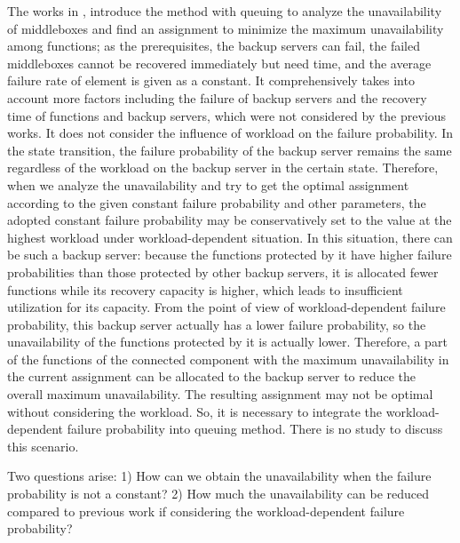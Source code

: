 \documentclass[conference]{IEEEtran}
\begin{document}
The works in \cite{he2020unavailability}, \cite{fujita2021analytical} introduce the method with queuing to analyze the unavailability of middleboxes and find an assignment to minimize the maximum unavailability among functions; as the prerequisites, the backup servers can fail, the failed middleboxes cannot be recovered immediately but need time, and the average failure rate of element is given as a constant. It comprehensively takes into account more factors including the failure of backup servers and the recovery time of functions and backup servers, which were not considered by the previous works. It does not consider the influence of workload on the failure probability. In the state transition, the failure probability of the backup server remains the same regardless of the workload on the backup server in the certain state. Therefore, when we analyze the unavailability and try to get the optimal assignment according to the given constant failure probability and other parameters, the adopted constant failure probability may be conservatively set to the value at the highest workload under workload-dependent situation. In this situation, there can be such a backup server: because the functions protected by it have higher failure probabilities than those protected by other backup servers, it is allocated fewer functions while its recovery capacity is higher, which leads to insufficient utilization for its capacity. From the point of view of workload-dependent failure probability, this backup server actually has a lower failure probability, so the unavailability of the functions protected by it is actually lower. Therefore, a part of the functions of the connected component with the maximum unavailability in the current assignment can be allocated to the backup server to reduce the overall maximum unavailability. The resulting assignment may not be optimal without considering the workload. So, it is necessary to integrate the workload-dependent failure probability into queuing method. There is no study to discuss this scenario.

Two questions arise: 1) How can we obtain the unavailability when the failure probability is not a constant? 2) How much the unavailability can be reduced compared to previous work if considering the workload-dependent failure probability?
\end{document}
